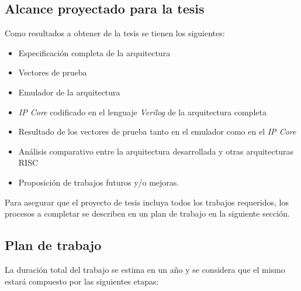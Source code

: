 \documentclass[a4paper]{article}
\begin{document}
\subsection{Alcance proyectado para la tesis}

Como resultados a obtener de la tesis se tienen los siguientes:

\begin{itemize}
    \item Especificación completa de la arquitectura
    \item Vectores de prueba
    \item Emulador de la arquitectura
    \item \emph{IP Core} codificado en el lenguaje \emph{Verilog} de la arquitectura completa
    \item Resultado de los vectores de prueba tanto en el emulador como en el \emph{IP Core}
    \item Análisis comparativo entre la arquitectura desarrollada y otras arquitecturas RISC
    \item Proposición de trabajos futuros y/o mejoras.
\end{itemize}

Para asegurar que el proyecto de tesis incluya todos los trabajos requeridos, los procesos a completar se describen en un plan de trabajo en la siguiente sección.

\newpage

\subsection{Plan de trabajo}

La duración total del trabajo se estima en un año y se considera que el mismo estará compuesto por las siguientes etapas:
\end{document}
